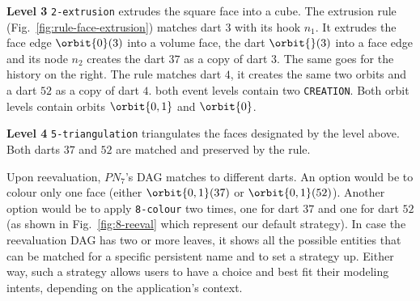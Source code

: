 \textbf{Level 3} \texttt{2-extrusion} extrudes the square face into a cube. The extrusion rule
(Fig.~\ref{fig:rule-face-extrusion}) matches dart $3$ with its hook $n_1$. It
extrudes the face edge $\orbit{0}(3)$ into a volume face, the dart $\orbit{}(3)$
into a face edge and its node $n_2$ creates the dart $37$ as a copy of dart $3$.
The same goes for the history on the right. The rule matches dart $4$, it
creates the same two orbits and a dart $52$ as a copy of dart $4$. %
both event levels contain two \texttt{CREATION}. Both orbit levels contain
orbits $\orbit{0,1}$ and $\orbit{0}$. %

\textbf{Level 4} \texttt{5-triangulation} triangulates the faces designated by the level above.
Both darts $37$ and $52$ are matched and preserved by the rule.

Upon reevaluation, $PN_7$'s DAG matches to different darts. An option would be to colour only one face (either $\orbit{0,1}(37)$ or $\orbit{0,1}(52)$). %
Another option would be to apply \texttt{8-colour} two times, one for dart $37$ and one for dart $52$ (as shown in Fig.~\ref{fig:8-reeval} which represent our default strategy). %
In case the reevaluation DAG has two or more leaves, it shows all the possible entities that can be matched for a specific persistent name and to set a strategy up.
Either way, such a strategy allows users to have a choice and best fit their modeling intents, depending on the application's context.

